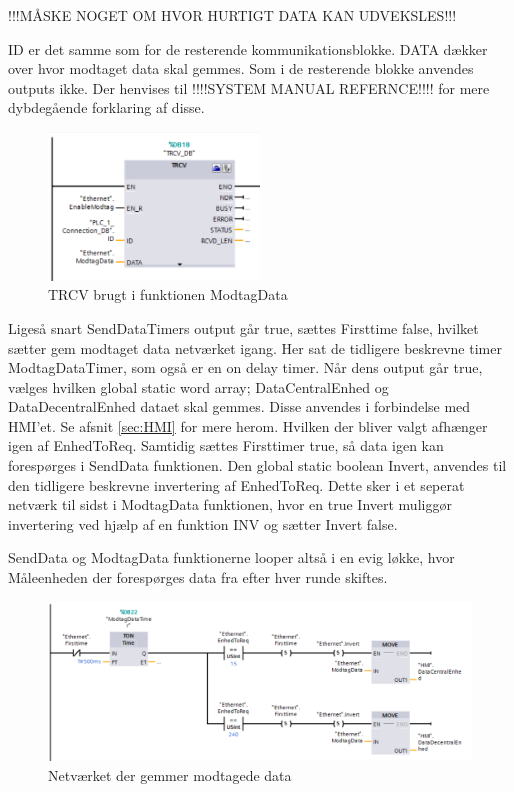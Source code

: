 !!!MÅSKE NOGET OM HVOR HURTIGT DATA KAN UDVEKSLES!!!

ID er det samme som for de resterende kommunikationsblokke. DATA dækker over hvor modtaget data skal gemmes. Som i de resterende blokke anvendes outputs ikke. Der henvises til !!!!SYSTEM MANUAL REFERNCE!!!! for mere dybdegående forklaring af disse.

\begin{figure}[H] %
	\centering
	\includegraphics[width=0.5\textwidth]{Figure/TRCV}
	\caption{TRCV brugt i funktionen ModtagData}
	\label{fig:TRCV}
\end{figure}

Ligeså snart SendDataTimers output går true, sættes Firsttime false, hvilket sætter gem modtaget data netværket igang. Her sat de tidligere beskrevne timer ModtagDataTimer, som også er en on delay timer. Når dens output går true, vælges hvilken global static word array; DataCentralEnhed og DataDecentralEnhed dataet skal gemmes. Disse anvendes i forbindelse med HMI'et. Se afsnit \ref{sec:HMI} for mere herom. Hvilken der bliver valgt afhænger igen af EnhedToReq. Samtidig sættes Firsttimer true, så data igen kan forespørges i SendData funktionen. Den global static boolean Invert, anvendes til den tidligere beskrevne invertering af EnhedToReq. Dette sker i et seperat netværk til sidst i ModtagData funktionen, hvor en true Invert muliggør invertering ved hjælp af en funktion INV og sætter Invert false.

SendData og ModtagData funktionerne looper altså i en evig løkke, hvor Måleenheden der forespørges data fra efter hver runde skiftes.

\begin{figure}[H] %
	\centering
	\includegraphics[width=1\textwidth]{Figure/GemModtagetData}
	\caption{Netværket der gemmer modtagede data}
	\label{fig:GemModtagetdata}
\end{figure}

